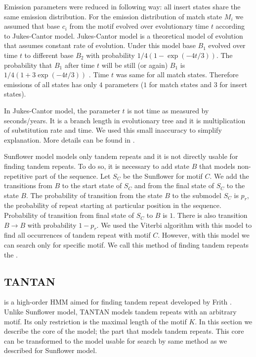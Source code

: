 Emission parameters were reduced in following way: all insert states share
the same emission distribution. For the emission distribution of match state $M_i$ we
assumed that base $c_i$ from the motif evolved over evolutionary time $t$
according to Jukes-Cantor model. Jukes-Cantor model is a theoretical model of evolution
that assumes constant rate of evolution. Under this model base $B_1$ evolved
over time $t$ to different base $B_2$  with probability $1/4(1-\exp(-4t/3))$.
The probability that $B_1$ after time $t$ will be still (or again) $B_1$  is
$1/4(1+3\exp(-4t/3))$ \cite{Durbin1998}. Time $t$ was same for all match
states. Therefore emissions of all states has only $4$ parameters ($1$ for
match states and $3$ for insert states).

\begin{note}
In Jukes-Cantor model, the parameter $t$ is not time as measured by
seconds/years. It is a branch length in evolutionary tree and it is
multiplication of substitution rate and time. We used this small inaccuracy to
simplify explanation.  More details can be found in \cite{Durbin1998}.
\end{note}

Sunflower model models only tandem repeats and it is not directly usable for
finding tandem repeats. To do so, it is necessary to add state $B$ that models
non-repetitive part of the sequence. Let $S_C$ be the Sunflower for motif  $C$.
We add the transitions from $B$ to the start state of $S_C$ and from the final
state of $S_C$ to the state $B$. The probability of transition from the state
$B$ to the submodel $S_C$ is $p_r$, the probability of repeat starting at
particular position in the sequence. Probability of transition from final state
of $S_C$ to $B$ is $1$.  There is also transition $B\to B$ with probability
$1-p_r$. We used the Viterbi algorithm with this model to find all occurrences
of tandem repeat with motif $C$. However, with this model we can search only
for specific motif. We call this method of finding tandem repeats the
.

\subsection{TANTAN}\label{SECTION:TANTAN}

 is a high-order HMM aimed for finding tandem repeat developed
by Frith \cite{Frith2011}. Unlike Sunflower model, TANTAN models tandem repeats
with an arbitrary motif. Its only restriction is the maximal length of the motif
$K$. In this section we describe the core of the model; the part that models
tandem repeats. This core can be transformed to the model usable for search by
same method as we described for Sunflower model.

